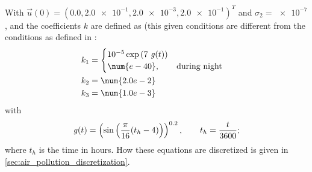 With $\vec{u}(0) = (0.0, \num{2.0e-1}, \num{2.0e-3}, \num{2.0e-1})^T$ and $\sigma_2 = \num{e-7}$, and the coefficients $k$ are defined as (this given conditions are different from the conditions as defined in \citet[pg.\ 8]{HundsdorferAndVerwer2003}:
\begin{align}
    k_1 & = \begin{cases}
        10^{-5} \exp{(7\ {\it g}(t))}
        \\
        \num{e-40}, \qquad \text{during  night}
    \end{cases}
    \\
    k_2 & = \num{2.0e-2}
    \\
    k_3 & = \num{1.0e-3}
\end{align}
with
\begin{align}
    {\it g}(t) =\left(\sin\left(\frac{\pi}{16} (t_h - 4)\right)\right)^{0.2}, \qquad t_h = \frac{t}{3600};
\end{align}
where $t_h$ is the time in hours.
How these equations are discretized is given in \autoref{sec:air_pollution_discretization}.
%
